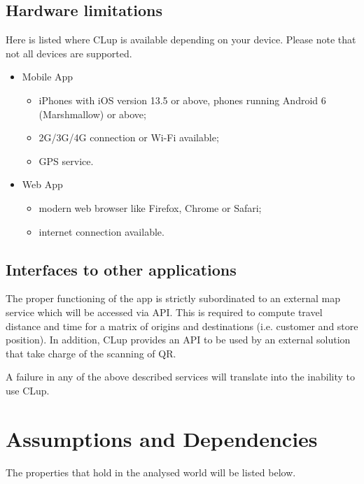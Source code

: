 \subsection{Hardware limitations}
 Here is listed where CLup is available depending on your device. Please note that not all devices are supported.
\begin{itemize}
	\item Mobile App
		\begin{itemize}
			\item iPhones with iOS version 13.5 or above, phones running Android 6 (Marshmallow) or above;
			\item 2G/3G/4G connection or Wi-Fi available;
			\item GPS service.
		\end{itemize}
	\item Web App
		\begin{itemize}
			\item modern web browser like Firefox, Chrome or Safari;
			\item internet connection available.
		\end{itemize}
\end{itemize}

\subsection{Interfaces to other applications}
The proper functioning of the app is strictly subordinated to an external map service which will be accessed via API. This is required to compute travel distance and time for a matrix of origins and destinations (i.e. customer and store position).\newline
In addition, CLup provides an API to be used by an external solution that take charge of the scanning of QR.

A failure in any of the above described services will translate into the inability to use CLup.

\section{Assumptions and Dependencies}
The properties that hold in the analysed world will be listed below.
